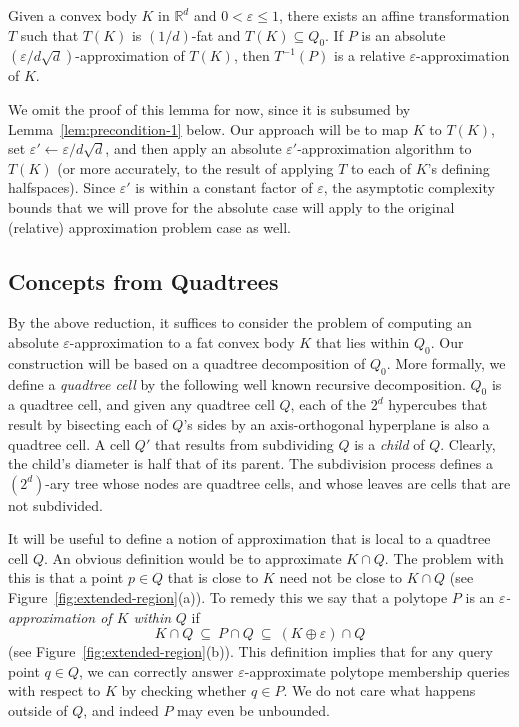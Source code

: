\documentclass[11pt]{article}   \usepackage[letterpaper,hmargin=2.1cm,vmargin=3cm]{geometry}
\newcommand{\RE}{\mathbb{R}}    \newcommand{\ZZ}{\mathbb{Z}}    \newcommand{\eps}{\varepsilon}  \newcommand{\ST}{\,:\,}         \newcommand{\sq}{\square}
\begin{document}
\begin{lemma} \label{lem:fat}
Given a convex body $K$ in $\RE^d$ and $0 < \eps \le 1$, there exists an affine transformation $T$ such that $T(K)$ is $(1/d)$-fat and $T(K) \subseteq Q_0$. If $P$ is an absolute $(\eps/d \sqrt{d})$-approximation of $T(K)$, then $T^{-1}(P)$ is a relative $\eps$-approximation of $K$.
\end{lemma}


We omit the proof of this lemma for now, since it is subsumed by Lemma~\ref{lem:precondition-1} below. Our approach will be to map $K$ to $T(K)$, set $\eps' \gets \eps/d \sqrt{d}$, and then apply an absolute $\eps'$-approximation algorithm to $T(K)$ (or more accurately, to the result of applying $T$ to each of $K$'s defining halfspaces). Since $\eps'$ is within a constant factor of $\eps$, the asymptotic complexity bounds that we will prove for the absolute case will apply to the original (relative) approximation problem case as well.


\subsection{Concepts from Quadtrees} \label{sec:prelim-quadtree}


By the above reduction, it suffices to consider the problem of computing an absolute $\eps$-approxi\-mation to a fat convex body $K$ that lies within $Q_0$. Our construction will be based on a quadtree decomposition of $Q_0$. More formally, we define a \emph{quadtree cell} by the following well known recursive decomposition. $Q_0$ is a quadtree cell, and given any quadtree cell $Q$, each of the $2^d$ hypercubes that result by bisecting each of $Q$'s sides by an axis-orthogonal hyperplane is also a quadtree cell. A cell $Q'$ that results from subdividing $Q$ is a \emph{child} of $Q$. Clearly, the child's diameter is half that of its parent. The subdivision process defines a $(2^d)$-ary tree whose nodes are quadtree cells, and whose leaves are cells that are not subdivided.

It will be useful to define a notion of approximation that is local to a quadtree cell $Q$. An obvious definition would be to approximate $K \cap Q$. The problem with this is that a point $p \in Q$ that is close to $K$ need not be close to $K \cap Q$ (see Figure~\ref{fig:extended-region}(a)). To remedy this we say that a polytope $P$ is an \emph{$\eps$-approximation of $K$ within} $Q$ if
\[
	K \cap Q
		~ \subseteq ~ P \cap Q
		~ \subseteq ~ (K \oplus \eps) \cap Q
\]
(see Figure~\ref{fig:extended-region}(b)). This definition implies that for any query point $q \in Q$, we can correctly answer $\eps$-approximate polytope membership queries with respect to $K$ by checking whether $q \in P$. We do not care what happens outside of $Q$, and indeed $P$ may even be unbounded.
\end{document}

